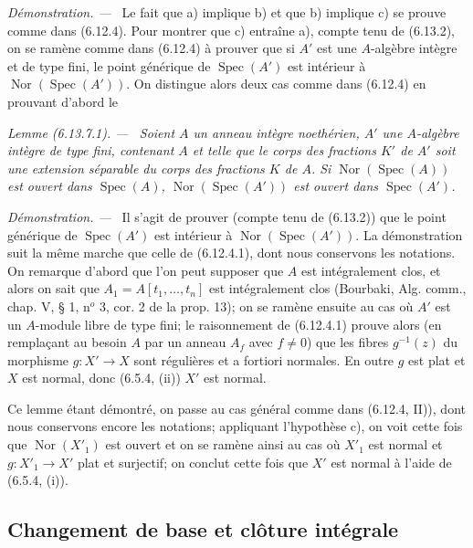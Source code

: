 \documentclass[10pt,oneside]{book}
\newenvironment{lemma}[1][]{%
  \par\medskip\noindent\itshape Lemme (#1). ---\ }{\par}
\newenvironment{proof}{%
  \par\medskip\noindent\textit{Démonstration. ---\ }}{\par}
\begin{document}
\begin{proof}
Le fait que a) implique b) et que b) implique c) se prouve comme dans
(6.12.4). Pour montrer que c) entraîne a), compte tenu de (6.13.2), on se
ramène comme dans (6.12.4) à prouver que si $A'$ est une $A$-algèbre intègre
et de type fini, le point générique de $\operatorname{Spec}(A')$ est
intérieur à $\operatorname{Nor}(\operatorname{Spec}(A'))$. On distingue
alors deux cas comme dans (6.12.4) en prouvant d'abord le

\begin{lemma}[6.13.7.1]
\label{IV.2.s6.13.7.1-fr}
Soient $A$ un anneau intègre noethérien, $A'$ une $A$-algèbre intègre de
type fini, contenant $A$ et telle que le corps des fractions $K'$ de $A'$
soit une extension séparable du corps des fractions $K$ de $A$. Si
$\operatorname{Nor}(\operatorname{Spec}(A))$ est ouvert dans
$\operatorname{Spec}(A)$, $\operatorname{Nor}(\operatorname{Spec}(A'))$ est
ouvert dans $\operatorname{Spec}(A')$.
\end{lemma}

\begin{proof}
Il s'agit de prouver (compte tenu de (6.13.2)) que le point générique de
$\operatorname{Spec}(A')$ est intérieur à
$\operatorname{Nor}(\operatorname{Spec}(A'))$. La démonstration suit la
même marche que celle de (6.12.4.1), dont nous conservons les notations. On
remarque d'abord que l'on peut supposer que $A$ est intégralement clos, et
alors on sait que $A_1=A[t_1,\ldots,t_n]$ est intégralement clos (Bourbaki,
Alg. comm., chap. V, § 1, n$^o$ 3, cor. 2 de la prop. 13); on se ramène
ensuite au cas où $A'$ est un $A$-module libre de type fini; le raisonnement
de (6.12.4.1) prouve alors (en remplaçant au besoin $A$ par un anneau $A_f$
avec $f\neq0$) que les fibres $g^{-1}(z)$ du morphisme $g:X'\to X$ sont
régulières et a fortiori normales. En outre $g$ est plat et $X$ est normal,
donc (6.5.4, (ii)) $X'$ est normal.
\end{proof}

Ce lemme étant démontré, on passe au cas général comme dans (6.12.4, II)),
dont nous conservons encore les notations; appliquant l'hypothèse c), on
voit cette fois que $\operatorname{Nor}(X'_1)$ est ouvert et on se ramène
ainsi au cas où $X'_1$ est normal et $g:X'_1\to X'$ plat et surjectif; on
conclut cette fois que $X'$ est normal à l'aide de (6.5.4, (i)).
\end{proof}

\subsection{Changement de base et clôture intégrale}
\label{IV.2.s6.14-fr}
\end{document}
